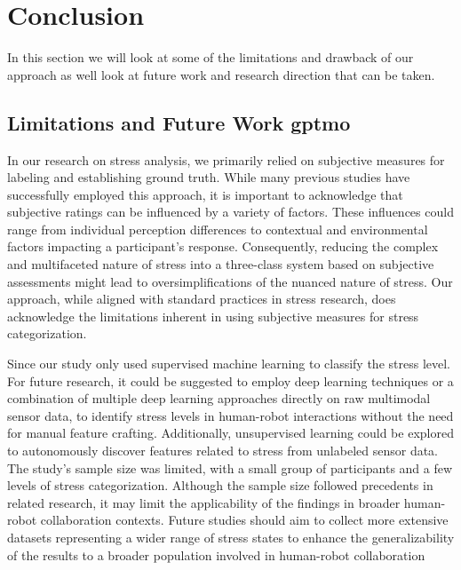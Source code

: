 \chapter{Conclusion}

In this section we will look at some of the limitations and drawback of our approach as well look at future work and research direction that can be taken.

\section{Limitations and Future Work \gls*{gptmo}}


In our research on stress analysis, we primarily relied on subjective measures for labeling and establishing ground truth. While many previous studies have successfully employed this approach, it is important to acknowledge that subjective ratings can be influenced by a variety of factors. These influences could range from individual perception differences to contextual and environmental factors impacting a participant's response. Consequently, reducing the complex and multifaceted nature of stress into a three-class system based on subjective assessments might lead to oversimplifications of the nuanced nature of stress.
Our approach, while aligned with standard practices in stress research, does acknowledge the limitations inherent in using subjective measures for stress categorization.

Since our study only used supervised machine learning to classify the stress level.
For future research, it could be suggested to employ deep learning techniques or a combination of multiple deep learning approaches directly on raw multimodal sensor data, to identify stress levels in human-robot interactions without the need for manual feature crafting. Additionally, unsupervised learning could be explored to autonomously discover features related to stress from unlabeled sensor data. The study's sample size was limited, with a small group of participants and a few levels of stress categorization. Although the sample size followed precedents in related research, it may limit the applicability of the findings in broader human-robot collaboration contexts. Future studies should aim to collect more extensive datasets representing a wider range of stress states to enhance the generalizability of the results to a broader population involved in human-robot collaboration


